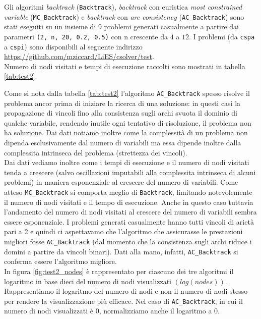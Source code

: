 \documentclass[10pt, a4paper]{article}
\begin{document}
Gli algoritmi \textit{backtrack} (\texttt{Backtrack}), \textit{backtrack} con euristica \textit{most constrained variable} (\texttt{MC\_Backtrack}) e \textit{backtrack} con \textit{arc consistency} (\texttt{AC\_Backtrack}) sono stati eseguiti su un insieme di 9 problemi generati casualmente a partire dai parametri \texttt{(2, n, 20, 0.2, 0.5)} con n crescente da $4$ a $12$. I problemi (da \texttt{cspa} a \texttt{cspi}) sono disponibili al seguente indirizzo \url{https://github.com/mziccard/LiES/csolver/test}.\\
Numero di nodi visitati e tempi di esecuzione raccolti sono mostrati in tabella \ref{tab:test2}.



Come si nota dalla tabella \ref{tab:test2} l'algoritmo \texttt{AC\_Backtrack} spesso risolve il problema ancor prima di iniziare la ricerca di una soluzione: in questi casi la propagazione di vincoli fino alla consistenza sugli archi svuota il dominio di qualche variabile, rendendo inutile ogni tentativo di risoluzione, il problema non ha soluzione. Dai dati notiamo inoltre come la complessità di un problema non dipenda esclusivamente dal numero di variabili ma essa dipende inoltre dalla complessita intrinseca del problema (strettezza dei vincoli).\\ Dai dati vediamo inoltre come i tempi di esecuzione e il numero di nodi visitati tenda a crescere (salvo oscillazioni imputabili alla complessita intrinseca di alcuni problemi) in maniera esponenziale al crescere del numero di variabili. Come atteso \texttt{MC\_Backtrack} si comporta meglio di \texttt{Backtrack}, limitando notevolemente il numero di nodi visitati e il tempo di esecuzione. Anche in questo caso tuttavia l'andamento del numero di nodi visitati al crescere del numero di variabili sembra essere esponenziale. I problemi generati casualmente hanno tutti vincoli di arietà pari a 2 e quindi ci aspettavamo che l'algoritmo che assicurasse le prestazioni migliori fosse \texttt{AC\_\allowbreak Backtrack} (dal momento che la consistenza sugli archi riduce i domini a partire da vincoli binari). Dati alla mano, infatti, \texttt{AC\_Backtrack} si conferma essere l'algoritmo migliore.\\
In figura \ref{fig:test2_nodes} è rappresentato per ciascuno dei tre algoritmi il logaritmo in base dieci del numero di nodi visualizzati $(log(nodes))$. Rappresentiamo il logaritmo del numero di nodi e non il numero di nodi stesso per rendere la visualizzazione più efficace. Nel caso di \texttt{AC\_Backtrack}, in cui il numero di nodi visualizzati è $0$, normalizziamo anche il logaritmo a $0$.
\end{document}
